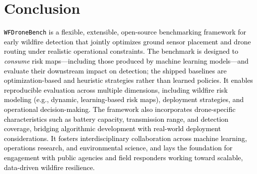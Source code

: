 \documentclass{article}
\newcommand{\blue}[1]{\textcolor{black}{#1}}
\begin{document}
\section{Conclusion}\label{sec:conclusion}

\blue{\texttt{WFDroneBench} is a flexible, extensible, open-source benchmarking framework for early wildfire detection that jointly optimizes ground sensor placement and drone routing under realistic operational constraints. The benchmark is designed to \emph{consume} risk maps---including those produced by machine learning models---and evaluate their downstream impact on detection; the shipped baselines are optimization-based and heuristic strategies rather than learned policies.  It enables reproducible evaluation across multiple dimensions, including wildfire risk modeling (e.g., dynamic, learning-based risk maps), deployment strategies, and operational decision-making. The framework also incorporates drone-specific characteristics such as battery capacity, transmission range, and detection coverage, bridging algorithmic development with real-world deployment considerations. It fosters interdisciplinary collaboration across machine learning, operations research, and environmental science, and lays the foundation for engagement with public agencies and field responders working toward scalable, data-driven wildfire resilience.}
\end{document}
